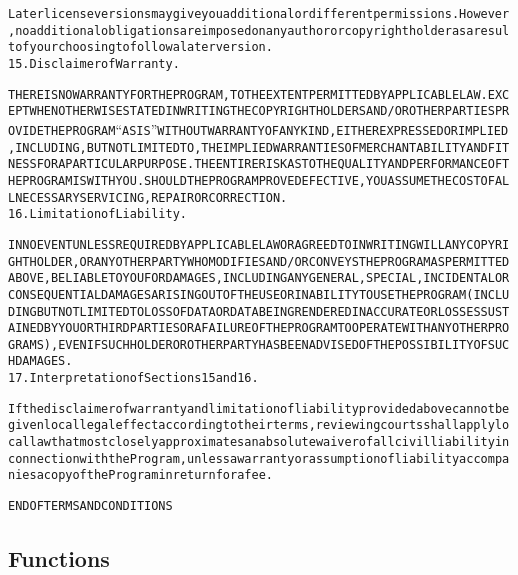 \begin{alltt}
Later license versions may give you additional or different permissions. However, no additional obligations are imposed on any author or copyright holder as a result of your choosing to follow a later version.
15. Disclaimer of Warranty.

THERE IS NO WARRANTY FOR THE PROGRAM, TO THE EXTENT PERMITTED BY APPLICABLE LAW. EXCEPT WHEN OTHERWISE STATED IN WRITING THE COPYRIGHT HOLDERS AND/OR OTHER PARTIES PROVIDE THE PROGRAM “AS IS” WITHOUT WARRANTY OF ANY KIND, EITHER EXPRESSED OR IMPLIED, INCLUDING, BUT NOT LIMITED TO, THE IMPLIED WARRANTIES OF MERCHANTABILITY AND FITNESS FOR A PARTICULAR PURPOSE. THE ENTIRE RISK AS TO THE QUALITY AND PERFORMANCE OF THE PROGRAM IS WITH YOU. SHOULD THE PROGRAM PROVE DEFECTIVE, YOU ASSUME THE COST OF ALL NECESSARY SERVICING, REPAIR OR CORRECTION.
16. Limitation of Liability.

IN NO EVENT UNLESS REQUIRED BY APPLICABLE LAW OR AGREED TO IN WRITING WILL ANY COPYRIGHT HOLDER, OR ANY OTHER PARTY WHO MODIFIES AND/OR CONVEYS THE PROGRAM AS PERMITTED ABOVE, BE LIABLE TO YOU FOR DAMAGES, INCLUDING ANY GENERAL, SPECIAL, INCIDENTAL OR CONSEQUENTIAL DAMAGES ARISING OUT OF THE USE OR INABILITY TO USE THE PROGRAM (INCLUDING BUT NOT LIMITED TO LOSS OF DATA OR DATA BEING RENDERED INACCURATE OR LOSSES SUSTAINED BY YOU OR THIRD PARTIES OR A FAILURE OF THE PROGRAM TO OPERATE WITH ANY OTHER PROGRAMS), EVEN IF SUCH HOLDER OR OTHER PARTY HAS BEEN ADVISED OF THE POSSIBILITY OF SUCH DAMAGES.
17. Interpretation of Sections 15 and 16.

If the disclaimer of warranty and limitation of liability provided above cannot be given local legal effect according to their terms, reviewing courts shall apply local law that most closely approximates an absolute waiver of all civil liability in connection with the Program, unless a warranty or assumption of liability accompanies a copy of the Program in return for a fee.

END OF TERMS AND CONDITIONS
\end{alltt}



  \subsection{Functions}

